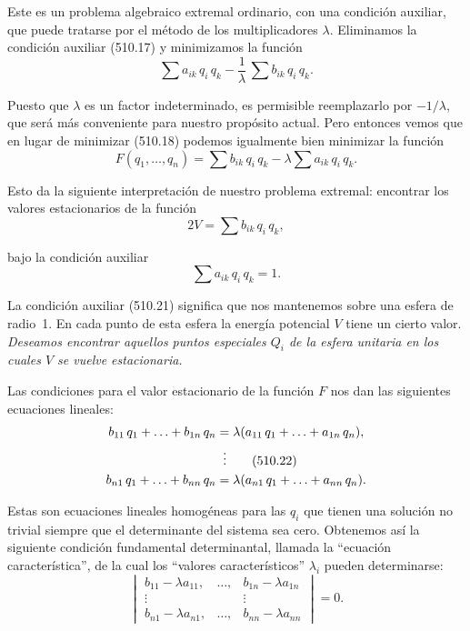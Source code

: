 \documentclass[12pt,a4paper]{book}
\begin{document}
Este es un problema algebraico extremal ordinario, con una condición auxiliar, que puede tratarse por el método de los multiplicadores $\lambda$. Eliminamos la condición auxiliar (510.17) y minimizamos la función
\begin{equation}
\sum a_{ik}\,q_i\,q_k - \frac{1}{\lambda}\,\sum b_{ik}\,q_i\,q_k. \tag{510.18}
\end{equation}

Puesto que $\lambda$ es un factor indeterminado, es permisible reemplazarlo por $-1/\lambda$, que será más conveniente para nuestro propósito actual. Pero entonces vemos que en lugar de minimizar (510.18) podemos igualmente bien minimizar la función
\begin{equation}
F(q_1, \ldots, q_n) = \sum b_{ik}\,q_i\,q_k - \lambda \sum a_{ik}\,q_i\,q_k. \tag{510.19}
\end{equation}

Esto da la siguiente interpretación de nuestro problema extremal: encontrar los valores estacionarios de la función
\begin{equation}
2V = \sum b_{ik}\,q_i\,q_k, \tag{510.20}
\end{equation}


bajo la condición auxiliar
\begin{equation}
\sum a_{ik}\,q_i\,q_k = 1. \tag{510.21}
\end{equation}

La condición auxiliar (510.21) significa que nos mantenemos sobre una esfera de radio~1. En cada punto de esta esfera la energía potencial $V$ tiene un cierto valor. \textit{Deseamos encontrar aquellos puntos especiales $Q_i$ de la esfera unitaria en los cuales $V$ se vuelve estacionaria.}

Las condiciones para el valor estacionario de la función $F$ nos dan las siguientes ecuaciones lineales:
\begin{align}
b_{11}\,q_1 + \ldots + b_{1n}\,q_n &= \lambda(a_{11}\,q_1 + \ldots + a_{1n}\,q_n), \notag \\
&\;\;\vdots \tag{510.22} \\
b_{n1}\,q_1 + \ldots + b_{nn}\,q_n &= \lambda(a_{n1}\,q_1 + \ldots + a_{nn}\,q_n). \notag
\end{align}

Estas son ecuaciones lineales homogéneas para las $q_i$ que tienen una solución no trivial siempre que el determinante del sistema sea cero. Obtenemos así la siguiente condición fundamental determinantal, llamada la ``ecuación característica'', de la cual los ``valores característicos'' $\lambda_i$ pueden determinarse:
\begin{equation}
\begin{vmatrix}
b_{11} - \lambda a_{11}, & \ldots, & b_{1n} - \lambda a_{1n} \\
\vdots & & \vdots \\
b_{n1} - \lambda a_{n1}, & \ldots, & b_{nn} - \lambda a_{nn}
\end{vmatrix} = 0. \tag{510.23}
\end{equation}
\end{document}
